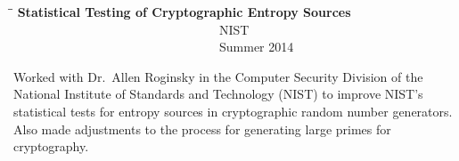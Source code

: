 \documentclass{res}
\begin{document}
\begin{resume}
	\begin{tabbing}
	\hspace{3in}\=  \hspace{1.63in}\= \kill %
	{\bf Statistical Testing of Cryptographic Entropy Sources} \>~~~~~~~~~~~~~~~~~~~~~~~~~~~~~~~~~NIST 
 \>~~~~~~~~~~~~~~~~~~~~~~~~~~~~~~~~~Summer 2014\\      
	\end{tabbing} \vspace{-30pt}
	Worked with Dr.~Allen Roginsky in the Computer Security Division of the National Institute of Standards and Technology (NIST) to improve NIST's statistical tests for entropy sources in cryptographic random number generators.  Also made adjustments to the process for generating large primes for cryptography.
\\







%



%



\end{resume}
\end{document}
